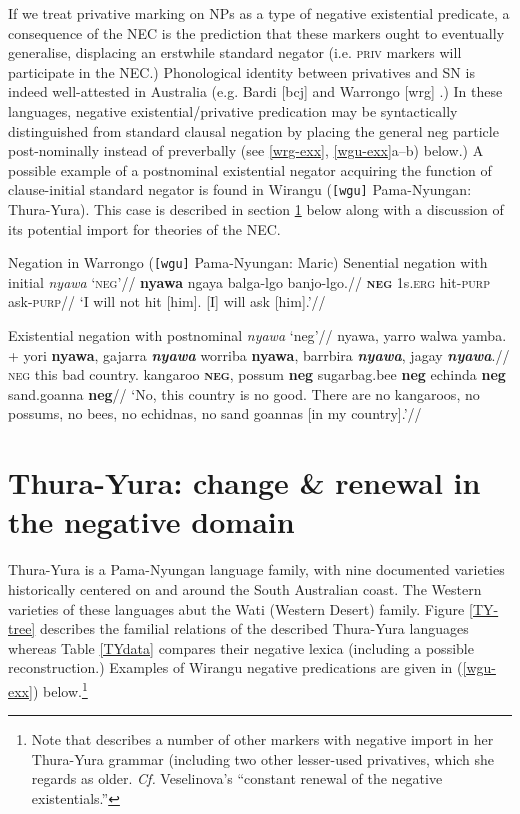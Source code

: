 \documentclass[usenames,dvipsnames,11pt]{article}
\begin{document}
{If we treat privative marking on NPs as a type of negative existential predicate, a consequence of the NEC is the prediction that these markers ought to eventually generalise, displacing an erstwhile standard negator (i.e. \textsc{priv}  markers will participate in the NEC.) Phonological identity between privatives and SN is indeed well-attested in Australia (e.g. Bardi [\gls{bcj}] \citep{Bowern2012} and Warrongo [\gls{wrg}] \citep{Tsunoda2011}.) In these languages, negative existential/privative predication may be syntactically distinguished from standard clausal negation by placing the general \gls{neg} particle post-nominally instead of preverbally (see \ref{wrg-exx}, \ref{wgu-exx}a--b) below.) A possible example of a postnominal existential negator acquiring the function of clause-initial standard negator is found in Wirangu (\texttt{[wgu]} Pama-Nyungan: Thura-Yura). This case is described in section \ref{TY} below along with a discussion of its potential import for theories of the NEC.

\pex Negation in Warrongo (\texttt{[wgu]} Pama-Nyungan: Maric)\label{wrg-exx}
\a\begingl\glpreamble Senential negation with initial \textit{nyawa} `\textsc{neg}'//
\gla \textbf{nyawa} ngaya balga-lgo banjo-lgo.//
\glb \textsc{\textbf{neg}} 1\gls{s}\textsc{.erg} hit\textsc{-purp} ask\textsc{-purp}//
\glft`I will not hit [him]. [I] will ask [him].'//\endgl

\a\begingl\glpreamble Existential negation with postnominal \textit{nyawa} `\gls{neg}'//
\gla nyawa, yarro walwa yamba. + yori \textbf{nyawa}, gajarra \textit{\textbf{nyawa}} worriba \textbf{nyawa}, barrbira \textbf{\textit{nyawa}}, jagay \textbf{\textit{nyawa}}.//
\glb \textsc{neg} this bad country. kangaroo \textsc{\textbf{neg}}, possum \textbf{\gls{neg}} sugarbag.bee \textbf{\gls{neg}} echinda \textbf{\gls{neg}} sand.goanna \textbf{\gls{neg}}//
\glft`No, this country is no good. There are no kangaroos, no possums, no bees, no echidnas, no sand goannas [in my country].'//\endgl
\xe

\section{Thura-Yura: change \& renewal in the negative domain}\label{TY}

Thura-Yura is a Pama-Nyungan language family, with nine documented varieties historically centered on and around the South Australian coast. The Western varieties of these languages abut the Wati (Western Desert) family. Figure \ref{TY-tree} describes the familial relations of the described Thura-Yura languages whereas Table \ref{TYdata} compares their negative lexica (including a possible reconstruction.) Examples of Wirangu negative predications are given in (\ref{wgu-exx}) below.\footnote{Note that \citep[57]{Hercus1999} describes a number of other markers with negative import in her Thura-Yura grammar (including two other lesser-used privatives, which she regards as older. \textit{Cf.} Veselinova's \citeyearpar[173]{Veselinova2016} ``constant renewal of the negative existentials.''}



}
\end{document}
